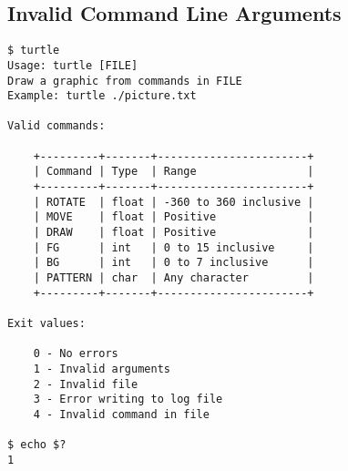 \documentclass[a4paper, 12pt, titlepage]{article}
\begin{document}
\pagebreak
\subsection{Invalid Command Line Arguments}

\begin{lstlisting}
$ turtle
Usage: turtle [FILE]
Draw a graphic from commands in FILE
Example: turtle ./picture.txt

Valid commands:

    +---------+-------+-----------------------+
    | Command | Type  | Range                 |
    +---------+-------+-----------------------+
    | ROTATE  | float | -360 to 360 inclusive |
    | MOVE    | float | Positive              |
    | DRAW    | float | Positive              |
    | FG      | int   | 0 to 15 inclusive     |
    | BG      | int   | 0 to 7 inclusive      |
    | PATTERN | char  | Any character         |
    +---------+-------+-----------------------+

Exit values:

    0 - No errors
    1 - Invalid arguments
    2 - Invalid file
    3 - Error writing to log file
    4 - Invalid command in file

$ echo $?
1
\end{lstlisting}

\newpage
\end{document}
